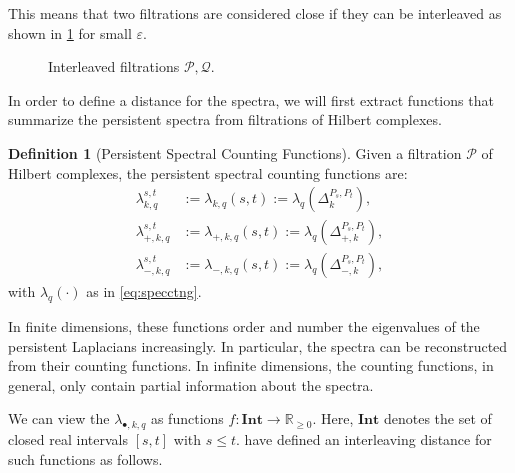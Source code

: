 \documentclass[11pt]{article}
\theoremstyle{definition}
\newtheorem{definition}[theorem]{Definition}
\theoremstyle{remark}
\newcommand{\Pp}{\mathcal{P}}
\newcommand{\Qq}{\mathcal{Q}}
\newcommand{\R}{\mathbb{R}}
\begin{document}
This means that two filtrations are considered close if they can be interleaved as shown in \cref{fig:intfil} for small $\varepsilon$.

\begin{figure}[h]
    \centering
    \caption{Interleaved filtrations $\Pp,\Qq$.} \label{fig:intfil}
\end{figure}

In order to define a distance for the spectra, we will first extract functions that summarize the persistent spectra from filtrations of Hilbert complexes.

\begin{definition}[Persistent Spectral Counting Functions] \label{def:persspecctng}
Given a filtration $\Pp$ of Hilbert complexes, the persistent spectral counting functions are:
\begin{align*}
    \lambda^{s,t}_{k,q}&:=\lambda_{k,q} (s,t):=\lambda_q(\Delta_{k}^{P_s,P_t}),\\
    \lambda^{s,t}_{+,k,q}&:=\lambda_{+,k,q} (s,t):=\lambda_q(\Delta_{+,k}^{P_s,P_t}),\\
    \lambda^{s,t}_{-,k,q}&:=\lambda_{-,k,q} (s,t):=\lambda_q(\Delta_{-,k}^{P_s,P_t}),
\end{align*}
with $\lambda_q(\cdot)$ as in \cref{eq:specctng}.
\end{definition}

In finite dimensions, these functions order and number the eigenvalues of the persistent Laplacians increasingly. In particular, the spectra can be reconstructed from their counting functions. In infinite dimensions, the counting functions, in general, only contain partial information about the spectra.

We can view the $\lambda_{\bullet,k,q}$ as functions $f : \mathbf{Int} \rightarrow \R_{\ge 0}$. Here, $\mathbf{Int}$ denotes the set of closed real intervals $[s,t]$ with $s \le t$. \citet{mww} have defined an interleaving distance for such functions as follows.
\end{document}
